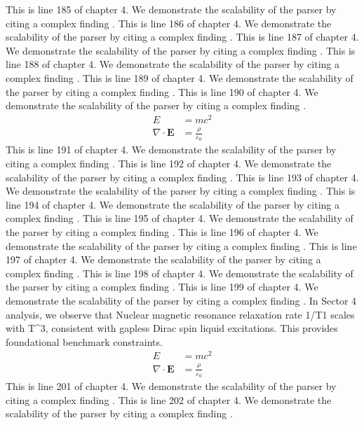 This is line 185 of chapter 4. We demonstrate the scalability of the parser by citing a complex finding \cite{ref4_185}.
This is line 186 of chapter 4. We demonstrate the scalability of the parser by citing a complex finding \cite{ref4_186}.
This is line 187 of chapter 4. We demonstrate the scalability of the parser by citing a complex finding \cite{ref4_187}.
This is line 188 of chapter 4. We demonstrate the scalability of the parser by citing a complex finding \cite{ref4_188}.
This is line 189 of chapter 4. We demonstrate the scalability of the parser by citing a complex finding \cite{ref4_189}.
This is line 190 of chapter 4. We demonstrate the scalability of the parser by citing a complex finding \cite{ref4_190}.
\begin{align*}
  E &= mc^2 \\
  \nabla \cdot \mathbf{E} &= \frac{\rho}{\varepsilon_0}
\end{align*}
This is line 191 of chapter 4. We demonstrate the scalability of the parser by citing a complex finding \cite{ref4_191}.
This is line 192 of chapter 4. We demonstrate the scalability of the parser by citing a complex finding \cite{ref4_192}.
This is line 193 of chapter 4. We demonstrate the scalability of the parser by citing a complex finding \cite{ref4_193}.
This is line 194 of chapter 4. We demonstrate the scalability of the parser by citing a complex finding \cite{ref4_194}.
This is line 195 of chapter 4. We demonstrate the scalability of the parser by citing a complex finding \cite{ref4_195}.
This is line 196 of chapter 4. We demonstrate the scalability of the parser by citing a complex finding \cite{ref4_196}.
This is line 197 of chapter 4. We demonstrate the scalability of the parser by citing a complex finding \cite{ref4_197}.
This is line 198 of chapter 4. We demonstrate the scalability of the parser by citing a complex finding \cite{ref4_198}.
This is line 199 of chapter 4. We demonstrate the scalability of the parser by citing a complex finding \cite{ref4_199}.
In Sector 4 analysis, we observe that Nuclear magnetic resonance relaxation rate 1/T1 scales with T^3, consistent with gapless Dirac spin liquid excitations. This provides foundational benchmark constraints.
\begin{align*}
  E &= mc^2 \\
  \nabla \cdot \mathbf{E} &= \frac{\rho}{\varepsilon_0}
\end{align*}
This is line 201 of chapter 4. We demonstrate the scalability of the parser by citing a complex finding \cite{ref4_201}.
This is line 202 of chapter 4. We demonstrate the scalability of the parser by citing a complex finding \cite{ref4_202}.
